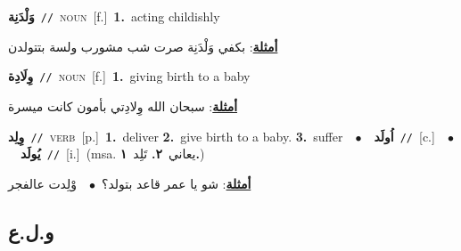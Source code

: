 \documentclass[10pt,a4paper,twoside]{article} %
\begin{document}
\begin{multicols}{2}
{\setlength\topsep{0pt}\textbf{\foreignlanguage{arabic}{وَلْدَنِة}}\ {\color{gray}\texttt{//}\color{black}}\ \textsc{noun}\ [f.]\ \textbf{1.}~acting childishly\  \begin{flushright}\color{gray}\foreignlanguage{arabic}{\textbf{\underline{\foreignlanguage{arabic}{أمثلة}}}: بكفي وَلْدَنِة صرت شب مشورب ولسة بتتولدن}\end{flushright}\color{black}} \vspace{2mm}

{\setlength\topsep{0pt}\textbf{\foreignlanguage{arabic}{وِلَادِة}}\ {\color{gray}\texttt{//}\color{black}}\ \textsc{noun}\ [f.]\ \textbf{1.}~giving birth to a baby\  \begin{flushright}\color{gray}\foreignlanguage{arabic}{\textbf{\underline{\foreignlanguage{arabic}{أمثلة}}}: سبحان الله وِلادِتي بأمون كانت ميسرة}\end{flushright}\color{black}} \vspace{2mm}

{\setlength\topsep{0pt}\textbf{\foreignlanguage{arabic}{وِلِد}}\ {\color{gray}\texttt{//}\color{black}}\ \textsc{verb}\ [p.]\ \textbf{1.}~deliver  \textbf{2.}~give birth to a baby.  \textbf{3.}~suffer\ \ $\bullet$\ \ \setlength\topsep{0pt}\textbf{\foreignlanguage{arabic}{اُولَد}}\ {\color{gray}\texttt{//}\color{black}}\ [c.]\ \ $\bullet$\ \ \setlength\topsep{0pt}\textbf{\foreignlanguage{arabic}{يُولَد}}\ {\color{gray}\texttt{//}\color{black}}\ [i.]\ \color{gray}(msa. \foreignlanguage{arabic}{يعاني}~\foreignlanguage{arabic}{\textbf{٢.}}  \foreignlanguage{arabic}{تَلِد}~\foreignlanguage{arabic}{\textbf{١.}})\color{black}\  \begin{flushright}\color{gray}\foreignlanguage{arabic}{\textbf{\underline{\foreignlanguage{arabic}{أمثلة}}}: شو يا عمر قاعد بتولد؟\ $\bullet$\ \  وْلِدت عالفجر}\end{flushright}\color{black}} \vspace{2mm}

\vspace{-3mm}
\subsection*{\color{blue}\foreignlanguage{arabic}{و.ل.ع}\color{blue}{}} 


\end{multicols}
\end{document}
